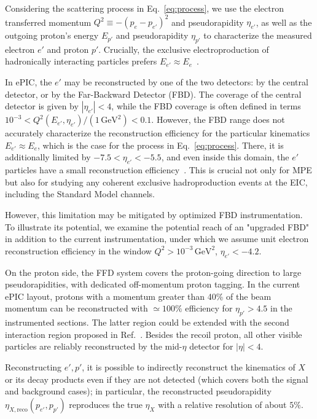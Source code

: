 \documentclass[aps,prd,preprintnumbers,superscriptaddress,nofootinbib,floatfix,twocolumn,notitlepage,reprint]{revtex4-2}
\newcommand{\GeV}{\mathrm{GeV}}
\begin{document}
Considering the scattering process in Eq.~\eqref{eq:process}, we use the electron transferred momentum $Q^2\equiv-(p_e-p_{e'})^2$ and pseudorapidity $\eta_{e'}$, as well as the outgoing proton's energy $E_{p'}$ and pseudorapidity $\eta_{p'}$ to characterize the measured electron $e'$ and proton $p'$. Crucially, the exclusive electroproduction of hadronically interacting particles prefers $E_{e'}\approx E_{e}$~\cite{Balkin:2026whv}. 

In ePIC, the $e'$ may be reconstructed by one of the two detectors: by the central detector, or by the Far-Backward Detector (FBD). The coverage of the central detector is given by $|\eta_{e'}|<4$, while the FBD coverage is often defined in terms $10^{-3}< Q^2(E_{e'},\eta_{e'})/(1\,\GeV^2) < 0.1$. However, the FBD range does not accurately characterize the reconstruction efficiency for the particular kinematics $E_{e'}\approx E_{e}$, which is the case for the process in Eq.~\eqref{eq:process}. There, it is additionally limited by $-7.5<\eta_{e'}<-5.5$, and even inside this domain, the $e'$ particles have a small reconstruction efficiency~\cite{AbdulKhalek:2021gbh,Klest:2025fwx}. This is crucial not only for MPE but also for studying any coherent exclusive hadroproduction events at the EIC, including the Standard Model channels.

However, this limitation may be mitigated by optimized FBD instrumentation. 
To illustrate its potential, we examine the potential reach of an "upgraded FBD" in addition to the current instrumentation, under which we assume unit electron reconstruction efficiency in the window $Q^{2}>10^{-3}\,\GeV^{2}$, $\eta_{e'}<-4.2$.

On the proton side, the FFD system covers the proton-going direction to large pseudorapidities, with dedicated off-momentum proton tagging. 
In the current ePIC layout, protons with a momentum greater than 40\% of the beam momentum can be reconstructed with $\simeq 100\%$ efficiency for $\eta_{p'} > 4.5$ in the instrumented sections. The latter region could be extended with the second interaction region proposed in Ref.~\cite{PhysRevD.111.072013}. Besides the recoil proton, all other visible particles are reliably reconstructed by the mid-$\eta$ detector for $|\eta|<4$. 

Reconstructing $e',p'$, it is possible to indirectly reconstruct the kinematics of $X$ or its decay products even if they are not detected (which covers both the signal and background cases); in particular, the reconstructed pseudorapidity $\eta_{X,\text{reco}}(p_{e'},p_{p'})$ reproduces the true $\eta_{X}$ with a relative resolution of about $5\%$.
\end{document}
